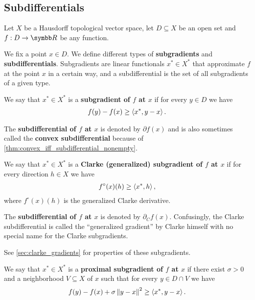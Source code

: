 \subsection{Subdifferentials}\label{sec:subdifferentials}

Let \( X \) be a Hausdorff topological vector space, let \( D \subseteq X \) be an open set and \( f: D \to \BB{R} \) be any function.

\begin{definition}\label{def:subdifferentials}
  We fix a point \( x \in D \). We define different types of \textbf{subgradients} and \textbf{subdifferentials}. Subgradients are linear functionals \( x^* \in X^* \) that approximate \( f \) at the point \( x \) in a certain way, and a subdifferential is the set of all subgradients of a given type.

  \begin{defenum}
    \item\label{def:subdifferentials/convex}\cite[59]{Clarke2013} We say that \( x^* \in X^* \) is a \textbf{subgradient of \( f \) at \( x \)} if for every \( y \in D \) we have
    \begin{align*}
      f(y) - f(x) \geq \left\langle x^*, y - x \right\rangle.
    \end{align*}

    The \textbf{subdifferential of \( f \) at \( x \)} is denoted by \( \partial f(x) \) and is also sometimes called the \textbf{convex subdifferential} because of \cref{thm:convex_iff_subdifferential_nonempty}.

    \item\label{def:subdifferentials/clarke}\cite[definition 10.3]{Clarke2013} We say that \( x^* \in X^* \) is a \textbf{Clarke (generalized) subgradient of \( f \) at \( x \)} if for every direction \( h \in X \) we have
    \begin{align*}
      f^\circ(x)(h) \geq \left\langle x^*, h \right\rangle,
    \end{align*}
    where \( f^\circ(x)(h) \) is the generalized Clarke derivative.

    The \textbf{subdifferential of \( f \) at \( x \)} is denoted by \( \partial_C f(x) \). Confusingly, the Clarke subdifferential is called the \enquote{generalized gradient} by Clarke himself with no special name for the Clarke subgradients.

    See \cref{sec:clarke_gradients} for properties of these subgradients.

    \item\label{def:subdifferentials/proximal}\cite[227]{Clarke2013} We say that \( x^* \in X^* \) is a \textbf{proximal subgradient of \( f \) at \( x \)} if there exist \( \sigma > 0 \) and a neighborhood \( V \subseteq X \) of \( x \) such that for every \( y \in D \cap V \) we have
    \begin{align*}
      f(y) - f(x) + \sigma \left\Vert y - x \right\Vert^2 \geq \left\langle x^*, y - x \right\rangle.
    \end{align*}


\end{defenum}
\end{definition}
